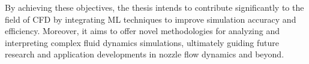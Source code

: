 By achieving these objectives, the thesis intends to contribute significantly to the field of CFD by integrating ML techniques to improve simulation accuracy and efficiency. Moreover, it aims to offer novel methodologies for analyzing and interpreting complex fluid dynamics simulations, ultimately guiding future research and application developments in nozzle flow dynamics and beyond.